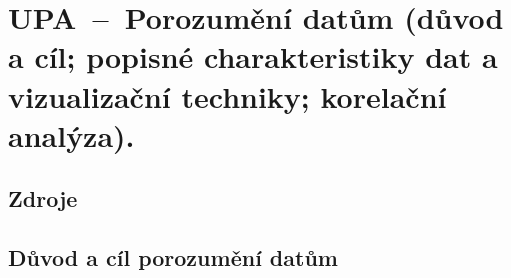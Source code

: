 

\graphicspath{{upa/porozumeni_datum/figures}}


\chapter{UPA~--~Porozumění datům (důvod a cíl; popisné charakteristiky dat a vizualizační techniky; korelační analýza).}


\section{Zdroje}

\begin{compactitem}
    \item {}
    \item {}
    \item {}
\end{compactitem}


\section{Důvod a cíl porozumění datům}

